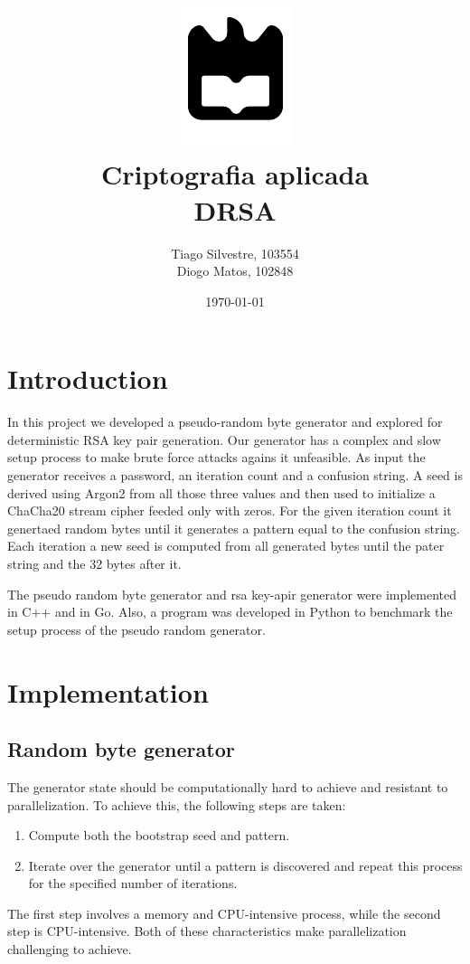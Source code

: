 \documentclass{article} %
\title{%
    \includegraphics[width=0.3\linewidth]{./assets/logo.pdf}\\[20pt]
    \Huge \bfseries Criptografia aplicada \\[10pt]
    \Large DRSA
}
\author{Tiago Silvestre, 103554 \\ Diogo Matos, 102848}
\date{\today}
\begin{document}
\maketitle

\newpage

\tableofcontents

\clearpage

\section{Introduction}
In this project we developed a pseudo-random byte generator and explored for deterministic RSA key pair generation. 
Our generator has a complex and slow setup process to make brute force attacks agains it unfeasible. As input the generator receives a password, an iteration count and a confusion string.
A seed is derived using Argon2 from all those three values and then used to initialize a ChaCha20 stream cipher feeded only with zeros. For the given iteration count it genertaed random bytes until it generates 
a pattern equal to the confusion string. Each iteration a new seed is computed from all generated bytes until the pater string and the 32 bytes after it.

The pseudo random byte generator and rsa key-apir generator were implemented in C++ and in Go. Also, a program was developed in Python to benchmark the setup process of the pseudo random generator.

\section{Implementation}
\subsection{Random byte generator}
The generator state should be computationally hard to achieve and resistant to parallelization. To achieve this, the following steps are taken:

\begin{enumerate}
    \item Compute both the bootstrap seed and pattern.
    \item Iterate over the generator until a pattern is discovered and repeat this process for the specified number of iterations.
\end{enumerate}

The first step involves a memory and CPU-intensive process, while the second step is CPU-intensive. Both of these characteristics make parallelization challenging to achieve.
\end{document}
